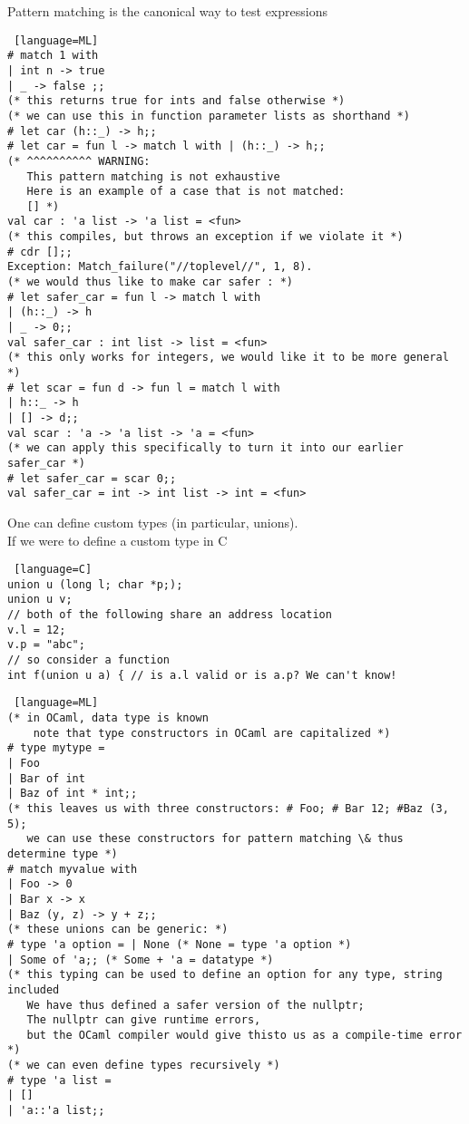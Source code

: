 \documentclass[../../lecture_notes.tex]{subfiles}
\begin{document}
\noindent Pattern matching is the canonical way to test expressions
\begin{lstlisting} [language=ML]
# match 1 with
| int n -> true
| _ -> false ;;
(* this returns true for ints and false otherwise *)
(* we can use this in function parameter lists as shorthand *)
# let car (h::_) -> h;;
# let car = fun l -> match l with | (h::_) -> h;;
(* ^^^^^^^^^^ WARNING: 
   This pattern matching is not exhaustive
   Here is an example of a case that is not matched:
   [] *)
val car : 'a list -> 'a list = <fun>
(* this compiles, but throws an exception if we violate it *)
# cdr [];;
Exception: Match_failure("//toplevel//", 1, 8).
(* we would thus like to make car safer : *)
# let safer_car = fun l -> match l with 
| (h::_) -> h
| _ -> 0;;
val safer_car : int list -> list = <fun>
(* this only works for integers, we would like it to be more general *)
# let scar = fun d -> fun l = match l with
| h::_ -> h
| [] -> d;;
val scar : 'a -> 'a list -> 'a = <fun>
(* we can apply this specifically to turn it into our earlier safer_car *)
# let safer_car = scar 0;;
val safer_car = int -> int list -> int = <fun>
\end{lstlisting} \medskip

\noindent One can define custom types (in particular, unions).\\
\indent If we were to define a custom type in C
\begin{lstlisting} [language=C]
union u (long l; char *p;);
union u v;
// both of the following share an address location
v.l = 12;
v.p = "abc";
// so consider a function
int f(union u a) { // is a.l valid or is a.p? We can't know!
\end{lstlisting}
\begin{lstlisting} [language=ML]
(* in OCaml, data type is known
    note that type constructors in OCaml are capitalized *)
# type mytype =
| Foo
| Bar of int
| Baz of int * int;;
(* this leaves us with three constructors: # Foo; # Bar 12; #Baz (3, 5); 
   we can use these constructors for pattern matching \& thus determine type *)
# match myvalue with
| Foo -> 0
| Bar x -> x
| Baz (y, z) -> y + z;;
(* these unions can be generic: *)
# type 'a option = | None (* None = type 'a option *)
| Some of 'a;; (* Some + 'a = datatype *)
(* this typing can be used to define an option for any type, string included 
   We have thus defined a safer version of the nullptr;
   The nullptr can give runtime errors, 
   but the OCaml compiler would give thisto us as a compile-time error *)
(* we can even define types recursively *)
# type 'a list = 
| []
| 'a::'a list;;
\end{lstlisting}\medskip
\end{document}
